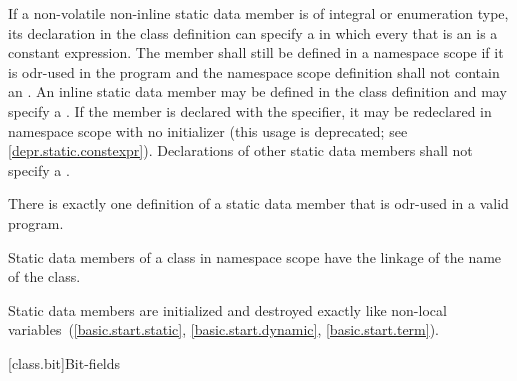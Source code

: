 \pnum
If a non-volatile non-inline  static data member is
of integral or enumeration type,
its declaration in the class definition can specify a
 in which every
 that is an 
is a constant expression.
The member shall still be defined in a namespace scope if
it is odr-used in the program and the
namespace scope definition shall not contain an .
An inline static data member may be defined in the class definition
and may specify a . If the
member is declared with the  specifier, it may be
redeclared in namespace scope with no initializer (this usage is
deprecated; see \ref{depr.static.constexpr}). Declarations of other
static data members shall not specify a .

\pnum
\begin{note}
There is exactly one definition of a static data member
that is odr-used in a valid program.
\end{note}

\pnum
\begin{note}
Static data members of a class in namespace scope have the linkage of the name of the class.
\end{note}

\pnum
Static data members are initialized and destroyed exactly like
non-local variables~(\ref{basic.start.static}, \ref{basic.start.dynamic},
\ref{basic.start.term}).

[class.bit]{Bit-fields}%

